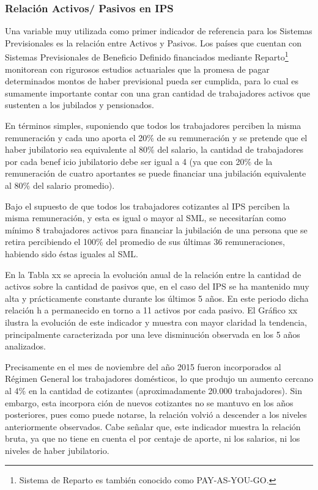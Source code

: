 \subsubsection{Relación Activos/ Pasivos en IPS}

Una variable muy utilizada como primer indicador de referencia para los
Sistemas Previsionales es la relación entre Activos y Pasivos. Los
países que cuentan con Sistemas Previsionales de Beneficio Definido
financiados mediante Reparto\footnote{Sistema 
de Reparto es también conocido como PAY-AS-YOU-GO.} monitorean con
rigurosos estudios actuariales que la promesa de pagar determinados
montos de haber previsional pueda ser cumplida, para lo cual es
sumamente importante contar con una gran cantidad de trabajadores
activos que sustenten a los jubilados y pensionados.

En términos simples, suponiendo que todos los trabajadores perciben la
misma remuneración y cada uno aporta el 20\% de su remuneración y se
pretende que el haber jubilatorio sea equivalente al 80\% del salario,
la cantidad de trabajadores por cada benef icio jubilatorio debe ser
igual a 4 (ya que con 20\% de la remuneración de cuatro aportantes se
puede financiar una jubilación equivalente al 80\% del salario
promedio).

Bajo el supuesto de que todos los trabajadores cotizantes al IPS
perciben la misma remuneración, y esta es igual o mayor al SML, se
necesitarían como mínimo 8 trabajadores activos para financiar la
jubilación de una persona que se retira percibiendo el 100\% del
promedio de sus últimas 36 remuneraciones, habiendo sido éstas iguales
al SML.

En la Tabla xx se aprecia la evolución anual de la relación entre la
cantidad de activos sobre la cantidad de pasivos que, en el caso del IPS
se ha mantenido muy alta y prácticamente constante durante los últimos 5
años. En este periodo dicha relación h a permanecido en torno a 11
activos por cada pasivo. El Gráfico xx ilustra la evolución de este
indicador y muestra con mayor claridad la tendencia, principalmente
caracterizada por una leve disminución observada en los 5 años
analizados.

Precisamente en el mes de noviembre del año 2015 fueron incorporados al
Régimen General los trabajadores domésticos, lo que produjo un aumento
cercano al 4\% en la cantidad de cotizantes (aproximadamente 20.000
trabajadores). Sin embargo, esta incorpora ción de nuevos cotizantes no
se mantuvo en los años posteriores, pues como puede notarse, la relación
volvió a descender a los niveles anteriormente observados. Cabe señalar
que, este indicador muestra la relación bruta, ya que no tiene en cuenta
el por centaje de aporte, ni los salarios, ni los niveles de haber
jubilatorio.

